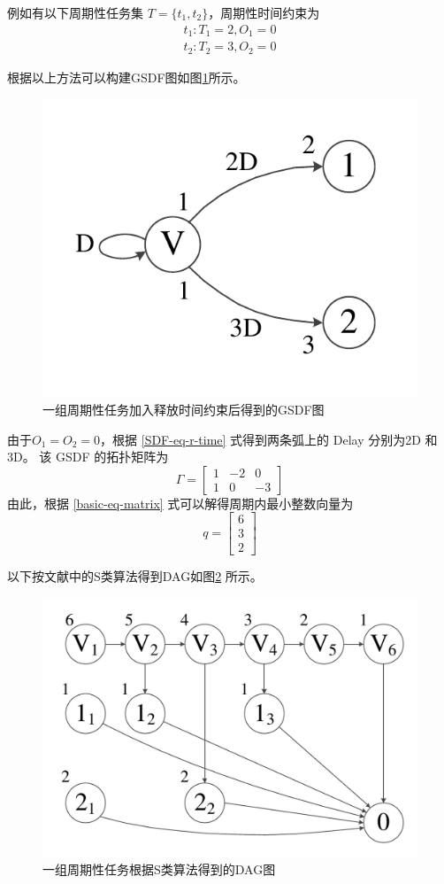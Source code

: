 

例如有以下周期性任务集 $T=\{t_1, t_2\}$，周期性时间约束为
\begin{gather*}
  t_1: T_1=2, O_1=0\\
  t_2: T_2=3, O_2=0
\end{gather*}

根据以上方法可以构建GSDF图如图\ref{SDF-fig-r-time}所示。

\begin{figure}[!htb]
  \centering
  \includegraphics[height=20ex]{figure/SDF-1-r-time.pdf}
  \caption{一组周期性任务加入释放时间约束后得到的GSDF图}
  \label{SDF-fig-r-time}
\end{figure}

由于$O_1=O_2 = 0$，根据 \eqref{SDF-eq-r-time} 式得到两条弧上的 Delay 分别为2D 和3D。 该 GSDF 的拓扑矩阵为
\begin{equation*}
  \Gamma=\begin{bmatrix}
    1 & -2 & 0 \\
    1 & 0 & -3
  \end{bmatrix}
\end{equation*}
由此，根据 \eqref{basic-eq-matrix} 式可以解得周期内最小整数向量为
\begin{equation*}
  q=\begin{bmatrix}
    6 \\
    3 \\
    2
  \end{bmatrix}
\end{equation*}

以下按文献\cite{SDF1987}中的S类算法得到DAG如图\ref{SDF-fig-DAG} 所示。

\begin{figure}[!htb]
  \centering
  \includegraphics[height=22ex]{figure/SDF-2-DAG.pdf}
  \caption{一组周期性任务根据S类算法得到的DAG图}
  \label{SDF-fig-DAG}
\end{figure}

